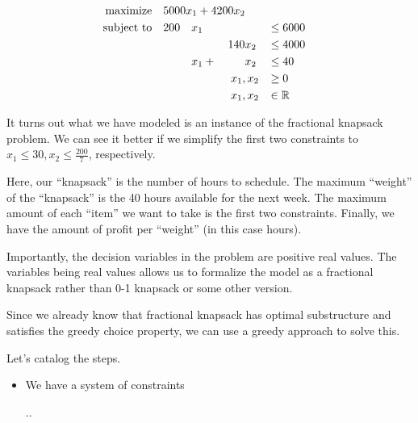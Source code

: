 \documentclass[12pt,letterpaper]{article}
\begin{document}
\begin{enumerate}
      \begin{alignat*}{7}
        \text{maximize}   \quad \rlap{$5000 x_1 + 4200 x_2$}                                        \\
        \text{subject to} \quad & 200 & x_1 &       &     &                   && \leq 6000          \\
                                &     &     &       & 140 & x_2               && \leq 4000          \\
                                &     & x_1 & {}+{} &     & x_2               && \leq 40            \\
                                &     &     &       &     & \clap{$x_1, x_2$} && \geq 0             \\
                                &     &     &       &     & \clap{$x_1, x_2$} && \in  \mathbb{R}    \\
      \end{alignat*}

      It turns out what we have modeled is an instance of the fractional knapsack problem.
      We can see it better if we simplify the first two constraints to
      $x_1 \leq 30, x_2 \leq \frac{200}{7}$, respectively.

      Here, our ``knapsack'' is the number of hours to schedule.
      The maximum ``weight'' of the ``knapsack'' is the 40 hours available for the next week.
      The maximum amount of each ``item'' we want to take is the first two constraints.
      Finally, we have the amount of profit per ``weight'' (in this case hours).

      Importantly, the decision variables in the problem are positive real values.
      The variables being real values allows us to formalize the model as a fractional knapsack rather than 0-1 knapsack or some other version.

      Since we already know that fractional knapsack has optimal substructure and
      satisfies the greedy choice property,
      we can use a greedy approach to solve this.

      Let's catalog the steps.

      \begin{itemize}
        \item
          We have a system of constraints

          \sysdelim..


\end{itemize}
\end{enumerate}
\end{document}

